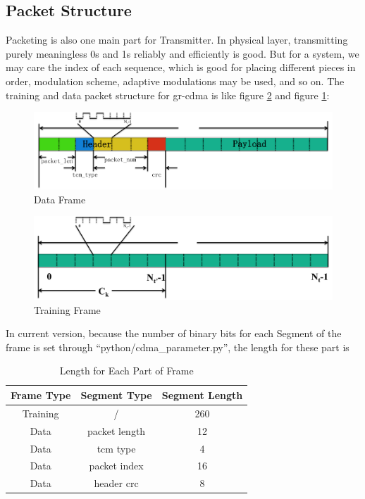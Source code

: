\documentclass[a4paper]{report}
\begin{document}

\subsection{Packet Structure} %
\label{sub:packet_structure}

Packeting is also one main part for Transmitter. In physical layer, transmitting purely meaningless 0s and 1s reliably and efficiently is good. But for a system, we may care the index of each sequence, which is good for placing different pieces in order, modulation scheme, adaptive modulations may be used, and so on. The training and data packet structure for gr-cdma is like figure \ref{fig:training_frame} and figure \ref{fig:data_frame}:
\begin{figure}[ht]
	\centering
	\includegraphics[width = 5in]{figure/data_frame.png}
	\caption{Data Frame}
	\label{fig:data_frame}
\end{figure}
\begin{figure}[ht]
	\centering
	\includegraphics[width = 5in]{figure/training_frame.png}
	\caption{Training Frame}
	\label{fig:training_frame}
\end{figure}

In current version, because the number of binary bits for each Segment of the frame is set through ``python/cdma\_parameter.py'', the length for these part is 
\begin{table}[ht]
	\centering
	\caption{Length for Each Part of Frame}
	\label{tab:Length_for_each_part_of_frame}
	\begin{tabular}{ccc}
	\hline
		Frame Type 	& Segment Type 	& Segment Length\\ \hline
		Training 	& /		 		& 260			\\
		Data 		& packet length & 12 			\\
		Data 		& tcm type 		& 4 			\\
		Data 		& packet index 	& 16 			\\
		Data 		& header crc 	& 8 			\\ \hline
	\end{tabular}
\end{table}
\end{document}
